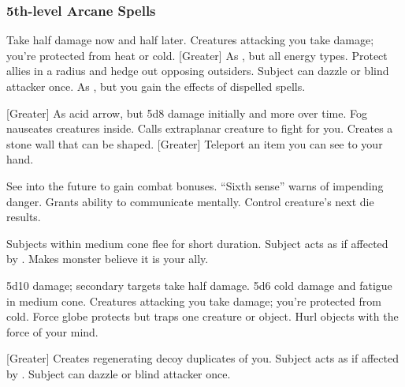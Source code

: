 \subsubsection{5th-level Arcane Spells} 
\begin{swspelllist}
     Take half damage now and half later. 
     Creatures attacking you take damage; you're protected from heat or cold.  [Greater] As , but all energy types.
     Protect allies in a \areamed radius and hedge out opposing outsiders.
     Subject can dazzle or blind attacker once.
     As , but you gain the effects of dispelled spells.

    [Greater] As acid arrow, but 5d8 damage initially and more over time.
     Fog nauseates creatures inside.
     Calls extraplanar creature to fight for you.
     Creates a stone wall that can be shaped.
    [Greater] Teleport an item you can see to your hand.

     See into the future to gain combat bonuses.
     ``Sixth sense'' warns of impending danger.
     Grants ability to communicate mentally. 
     Control creature's next die results.

     Subjects within medium cone flee for short duration.
    \spellhead{}
     Subject acts as if affected by .
     Makes monster believe it is your ally.

     5d10 damage; secondary targets take half damage.
     5d6 cold damage and fatigue in medium cone.
     Creatures attacking you take damage; you're protected from cold.
     Force globe protects but traps one creature or object.
     Hurl objects with the force of your mind.

    [Greater] Creates regenerating decoy duplicates of you.
     Subject acts as if affected by .
     Subject can dazzle or blind attacker once.
    \spellhead*{}


\end{swspelllist}
